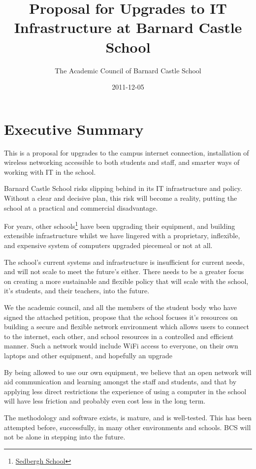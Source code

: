 \documentclass[a4paper,leqno,titlepage]{article}
\title{Proposal for Upgrades to IT Infrastructure at Barnard Castle School}
\author{The Academic Council of Barnard Castle School}
\date{2011-12-05}
\begin{document}
\maketitle

\section{Executive Summary}

This is a proposal for upgrades to the campus internet connection,
installation of wireless networking accessible to both students and staff,
and smarter ways of working with IT in the school. 

Barnard Castle School risks slipping behind in its
IT infrastructure and policy.
Without a clear and decisive plan, this risk will become a reality, putting
the school at a practical and commercial disadvantage.


For years, other schools\footnote{\href{http://www.sedberghschool.org/ict.html}{Sedbergh School}} 
have been upgrading their equipment, and building extensible infrastructure
whilst we have lingered with a proprietary, inflexible, and expensive system of
computers upgraded piecemeal or not at all.


The school's current systems and infrastructure is insufficient for current
needs, and will not scale to meet the future's either.
There needs to be a greater focus on creating a more sustainable and flexible
policy that will scale with the school, it's students, and their teachers, into
the future.


We the academic council, and all the members of the student body who have signed
the attached petition, propose that the school focuses it's resources on building
a secure and flexible network environment which allows users to connect to the
internet, each other, and school resources in a controlled and efficient manner.
Such a network would include WiFi access to everyone, on their own laptops and
other equipment, and hopefully an upgrade 


By being allowed to use our own equipment, we believe that an open network will
aid communication and learning amongst the staff and students, and that by
applying less direct restrictions the experience of using a computer in the
school will have less friction and probably even cost less in the long term.


The methodology and software exists, is mature, and is well-tested. This has been
attempted before, successfully, in many other environments and schools. BCS will
not be alone in stepping into the future.
\end{document}
